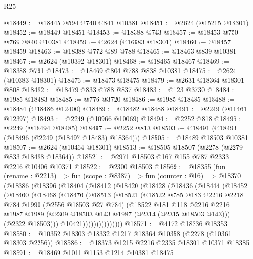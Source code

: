 \begin{lexlean}{R25}
\begin{coremodule}
@18449 := @18445 @594 @740 @841 @10381
@18451 := @2624 (@15215 @18301)
@18452 := @18449 @18451
@18453 := @18388 @743
@18457 := @18453 @750 @769 @840 @10381
@18459 := @2624 (@16683 @18301)
@18460 := @18457 @18459
@18463 := @18388 @772 @89 @788
@18465 := @18463 @839 @10381
@18467 := @2624 (@10392 @18301)
@18468 := @18465 @18467
@18469 := @18388 @791
@18473 := @18469 @804 @788 @838 @10381
@18475 := @2624 (@10383 @18301)
@18476 := @18473 @18475
@18479 := @2631 @18364 @18301 @808
@18482 := @18479 @833 @788 @837
@18483 := @123 @3730
@18484 := @1985 @18483
@18485 := @776 @3720
@18486 := @1985 @18485
@18488 := @18484 (@18486 @12400)
@18489 := @18482 @18488
@18491 := @2249 (@11461 @12397)
@18493 := @2249 (@10966 @10069)
@18494 := @2252 @818
@18496 := @2249 (@18494 @18485)
@18497 := @2252 @813
@18503 := @18491 (@18493 (@18496 (@2249 (@18497 @18483) @18364)))
@18505 := @18489 @18503 @10381
@18507 := @2624 (@10464 @18301)
@18513 := @18505 @18507 (@2278 (@2279 @833 @18488 @18364))
@18521 := @2971 @18503 @167 @155 @787 @2333 @2216 @10406 @10371
@18522 := @2300 @18503
@18569 := @18355
    (fun (rename : @2213) =>
    fun (scope : @8387) =>
    fun (counter : @16) =>
    @18370
      (@18386
        (@18396
          (@18404
            (@18412
              (@18420
                (@18428
                  (@18436
                    (@18444
                      (@18452
                        (@18460
                          (@18468
                            (@18476
                              (@18513
                                (@18521
                                  (@18522
                                    @785
                                    @183
                                    @2216
                                    @2218
                                    @784
                                    @1990
                                    (@2556 @18503 @27 @784)
                                    (@18522
                                      @181
                                      @118
                                      @2216
                                      @2216
                                      @1987
                                      @1989
                                      (@2309 @18503 @143 @1987 (@2314 (@2315 @18503 @143)))
                                      (@2322 @18503)))
                                  @10421)))))))))))))))
@18571 := @4172 @18336 @18353
@18580 := @10352 @18303 @18332 @1217 @18364 @10358 (@2278 (@10361 @18303 @2256))
@18586 := @18373 @1215 @2216 @2335 @18301 @10371 @18385
@18591 := @18469 @1011 @1153 @1214 @10381 @18475

\end{coremodule}
\end{lexlean}
